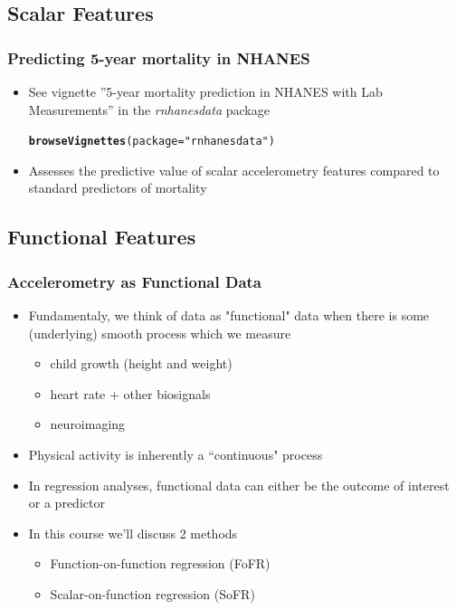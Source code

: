 \documentclass[10pt]{beamer}\usepackage[]{graphicx}\usepackage[]{color}
\makeatletter
\newcommand{\hlstr}[1]{\textcolor[rgb]{0.192,0.494,0.8}{#1}}%
\newcommand{\hlstd}[1]{\textcolor[rgb]{0.345,0.345,0.345}{#1}}%
\newcommand{\hlkwc}[1]{\textcolor[rgb]{0.333,0.667,0.333}{#1}}%
\newcommand{\hlkwd}[1]{\textcolor[rgb]{0.737,0.353,0.396}{\textbf{#1}}}%
\newenvironment{kframe}{%
 \def\at@end@of@kframe{}%
 \ifinner\ifhmode%
  \def\at@end@of@kframe{\end{minipage}}%
  \begin{minipage}{\columnwidth}%
 \fi\fi%
 \def\FrameCommand##1{\hskip\@totalleftmargin \hskip-\fboxsep
 \colorbox{shadecolor}{##1}\hskip-\fboxsep
     \hskip-\linewidth \hskip-\@totalleftmargin \hskip\columnwidth}%
 \MakeFramed {\advance\hsize-\width
   \@totalleftmargin\z@ \linewidth\hsize
   \@setminipage}}%
 {\par\unskip\endMakeFramed%
 \at@end@of@kframe}
\newenvironment{knitrout}{}{} %
\makeatother
\begin{document}
\subsection{Scalar Features}


\begin{frame}[fragile]
\frametitle{Predicting 5-year mortality in NHANES}
\begin{itemize}
\item See vignette ''5-year mortality prediction in NHANES with Lab Measurements''  in the {\it rnhanesdata} package

\begin{knitrout}\small
{}\color{fgcolor}\begin{kframe}
\begin{alltt}
\hlkwd{browseVignettes}\hlstd{(}\hlkwc{package}\hlstd{=}\hlstr{"rnhanesdata"}\hlstd{)}
\end{alltt}
\end{kframe}
\end{knitrout}
\item Assesses the predictive value of scalar accelerometry features compared to standard predictors of mortality
\end{itemize}
\end{frame}




\subsection{Functional Features}



\begin{frame}
\frametitle{Accelerometry as Functional Data}
\begin{itemize}
\item Fundamentaly, we think of data as "functional" data when there is some (underlying) smooth 
process which we measure
    \begin{itemize}
    \item child growth (height and weight)
    \item heart rate + other biosignals
    \item neuroimaging 
    \end{itemize}
\item Physical activity is inherently a ``continuous" process 
\item In regression analyses, functional data can either be the outcome of interest or a predictor
\item In this course we'll discuss 2 methods
    \begin{itemize}
    \item Function-on-function regression (FoFR)
    \item Scalar-on-function regression (SoFR)
    \end{itemize}
\end{itemize}
\end{frame}
\end{document}

